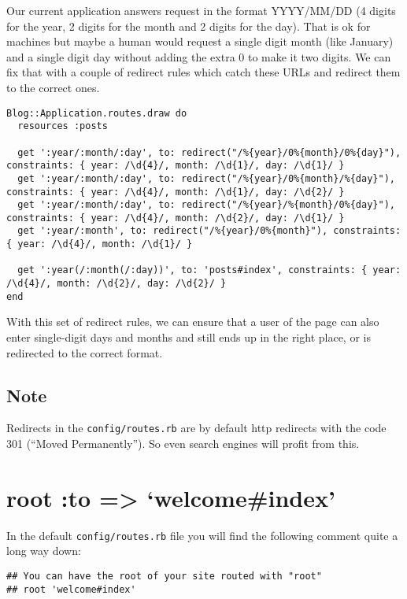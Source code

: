 \documentclass[a4paper]{book}
\begin{document}
Our current application answers request in the format YYYY/MM/DD (4 digits for the year, 2 digits for the month and 2 digits for the day). That is ok for machines but maybe a human would request a single digit month (like January) and a single digit day without adding the extra 0 to make it two digits. We can fix that with a couple of redirect rules which catch these URLs and redirect them to the correct ones.

\begin{shaded}\begin{verbatim}
Blog::Application.routes.draw do
  resources :posts

  get ':year/:month/:day', to: redirect("/%{year}/0%{month}/0%{day}"), constraints: { year: /\d{4}/, month: /\d{1}/, day: /\d{1}/ }
  get ':year/:month/:day', to: redirect("/%{year}/0%{month}/%{day}"), constraints: { year: /\d{4}/, month: /\d{1}/, day: /\d{2}/ }
  get ':year/:month/:day', to: redirect("/%{year}/%{month}/0%{day}"), constraints: { year: /\d{4}/, month: /\d{2}/, day: /\d{1}/ }
  get ':year/:month', to: redirect("/%{year}/0%{month}"), constraints: { year: /\d{4}/, month: /\d{1}/ }

  get ':year(/:month(/:day))', to: 'posts#index', constraints: { year: /\d{4}/, month: /\d{2}/, day: /\d{2}/ }
end
\end{verbatim}\end{shaded}

With this set of redirect rules, we can ensure that a user of the page can also enter single-digit days and months and still ends up in the right place, or is redirected to the correct format.

\subsection{Note}\label{note-36}

Redirects in the \texttt{config/routes.rb} are by default http redirects with the code 301 (“Moved Permanently”). So even search engines will profit from this.

\section{root :to =\textgreater{} `welcome\#index'}\label{root-to-welcomeindex}

In the default \texttt{config/routes.rb} file you will find the following comment quite a long way down:

\begin{shaded}\begin{verbatim}
## You can have the root of your site routed with "root"
## root 'welcome#index'
\end{verbatim}\end{shaded}
\end{document}
